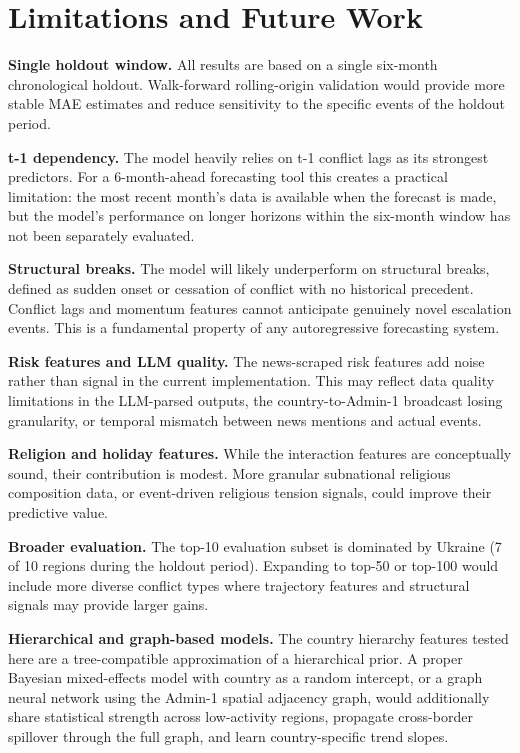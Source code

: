 \documentclass[12pt,a4paper]{article}
\begin{document}
\section{Limitations and Future Work}

\textbf{Single holdout window.} All results are based on a single
six-month chronological holdout. Walk-forward rolling-origin validation
would provide more stable MAE estimates and reduce sensitivity to the
specific events of the holdout period.

\textbf{t-1 dependency.} The model heavily relies on t-1 conflict lags
as its strongest predictors. For a 6-month-ahead forecasting tool this
creates a practical limitation: the most recent month's data is
available when the forecast is made, but the model's performance on
longer horizons within the six-month window has not been separately
evaluated.

\textbf{Structural breaks.} The model will likely underperform on
structural breaks, defined as sudden onset or cessation of conflict
with no historical precedent. Conflict lags and momentum features
cannot anticipate genuinely novel escalation events. This is a
fundamental property of any autoregressive forecasting system.

\textbf{Risk features and LLM quality.} The news-scraped risk features
add noise rather than signal in the current implementation. This may
reflect data quality limitations in the LLM-parsed outputs, the
country-to-Admin-1 broadcast losing granularity, or temporal mismatch
between news mentions and actual events.

\textbf{Religion and holiday features.} While the interaction features
are conceptually sound, their contribution is modest. More granular
subnational religious composition data, or event-driven religious
tension signals, could improve their predictive value.

\textbf{Broader evaluation.} The top-10 evaluation subset is dominated
by Ukraine (7 of 10 regions during the holdout period). Expanding to
top-50 or top-100 would include more diverse conflict types where
trajectory features and structural signals may provide larger gains.

\textbf{Hierarchical and graph-based models.} The country hierarchy
features tested here are a tree-compatible approximation of a
hierarchical prior. A proper Bayesian mixed-effects model with country
as a random intercept, or a graph neural network using the Admin-1
spatial adjacency graph, would additionally share statistical strength
across low-activity regions, propagate cross-border spillover through
the full graph, and learn country-specific trend slopes.
\end{document}
